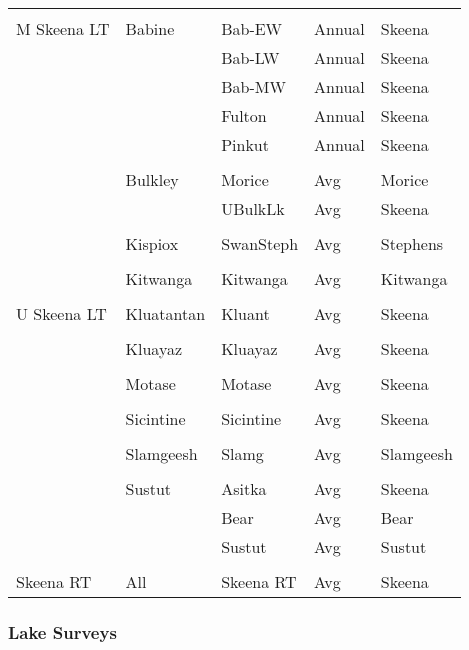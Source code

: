 \documentclass[french,11pt]{book}
\begin{document}
\begin{longtable}[t]{lllll}
\midrule\\ M Skeena LT & Babine & Bab-EW & Annual & Skeena\\  &  & Bab-LW & Annual & Skeena\\  &  & Bab-MW & Annual & Skeena\\  &  & Fulton & Annual & Skeena\\  &  & Pinkut & Annual & Skeena\\
\cmidrule(l){2-5}\\  & Bulkley & Morice & Avg & Morice\\  &  & UBulkLk & Avg & Skeena\\
\cmidrule(l){2-5}\\  & Kispiox & SwanSteph & Avg & Stephens\\
\cmidrule(l){2-5}\\  & Kitwanga & Kitwanga & Avg & Kitwanga\\
\midrule\\ U Skeena LT & Kluatantan & Kluant & Avg & Skeena\\
\cmidrule(l){2-5}\\  & Kluayaz & Kluayaz & Avg & Skeena\\
\cmidrule(l){2-5}\\  & Motase & Motase & Avg & Skeena\\
\cmidrule(l){2-5}\\  & Sicintine & Sicintine & Avg & Skeena\\
\cmidrule(l){2-5}\\  & Slamgeesh & Slamg & Avg & Slamgeesh\\
\cmidrule(l){2-5}\\  & Sustut & Asitka & Avg & Skeena\\  &  & Bear & Avg & Bear\\  &  & Sustut & Avg & Sustut\\
\midrule\\ Skeena RT & All & Skeena RT & Avg & Skeena\\* \end{longtable}

\endgroup{} \endgroup{}

\clearpage

\subsubsection{Lake Surveys}\label{lake-surveys}
\end{document}
